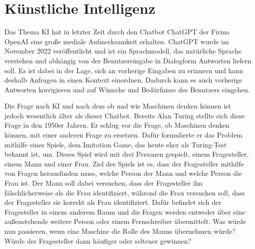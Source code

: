 \section{Künstliche Intelligenz}
\label{chap:KI}

Das Thema \ac{KI} hat in letzter Zeit durch den Chatbot ChatGPT der Firma OpenAI eine große mediale Aufmerksamkeit erhalten. 
ChatGPT wurde im November 2022 veröffentlicht und ist ein Sprachmodell, das natürliche Sprache verstehen und abhängig von der 
Benutzereingabe in Dialogform Antworten liefern soll. Es ist dabei in der Lage, sich an vorherige Eingaben zu erinnern und kann 
deshalb Anfragen in einen Kontext einordnen. Dadurch kann es auch vorherige Antworten korrigieren und auf Wünsche und Bedürfnisse 
des Benutzers eingehen. 

Die Frage nach \ac{KI} und nach dem ob und wie Maschinen denken können ist jedoch wesentlich älter als dieser Chatbot. 
Bereits Alan Turing stellte sich diese Frage in den 1950er Jahren. Er schlug vor die Frage, ob Maschinen denken können,
mit einer anderen Frage zu ersetzen. Dafür formulierte er das Problem mithilfe eines Spiels, dem \glqq Imitation Game\grqq, 
das heute eher als Turing-Test bekannt ist, um. Dieses Spiel wird mit drei Personen gespielt, einem Fragesteller, einem Mann und 
einer Frau. Ziel des Spiels ist es, dass der Fragesteller mithilfe von Fragen herausfinden muss, welche Person der Mann und welche Person 
die Frau ist. Der Mann soll dabei versuchen, dass der Fragesteller ihn fälschlicherweise als die Frau identifiziert, während die Frau versuchen soll, 
dass der Fragesteller sie korrekt als Frau identifiziert. Dafür befindet sich der Fragesteller in einem anderem Raum und die Fragen werden entweder 
über eine außenstehende weitere Person oder einem Fernschreiber übermittelt. Was würde nun passieren, wenn eine Maschine die Rolle des Manns übernehmen würde?
Würde der Fragesteller dann häufiger oder seltener gewinnen? 



